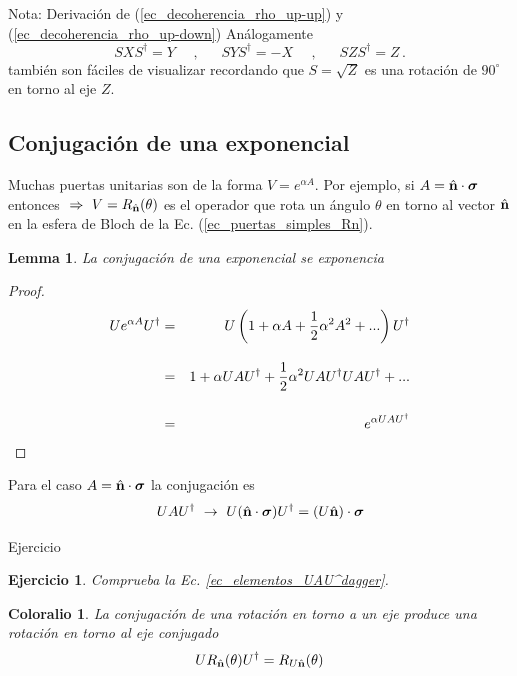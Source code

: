 \documentclass[a4paper,11pt]{book} %
\newtheorem{lemma_contador}{Lemma}
\newcommand{\Lemma}[1]{
		\begin{mybox_gray2}{}
			\begin{lemma_contador}
				 #1 
			\end{lemma_contador} 
		\end{mybox_gray2}
	}
\newtheorem{corolario_contador}{Coloralio}
\newcommand{\Corolario}[1]{
		\begin{mybox_gray2}{}
			\begin{corolario_contador}
				 #1 
			\end{corolario_contador} 
		\end{mybox_gray2}
	}
\newtheorem{ejercicio_contador}{Ejercicio}
\newcommand{\Ejercicio}[1]{
		\begin{mybox_gray}{Ejercicio} 
			\begin{ejercicio_contador}
				 #1 
			\end{ejercicio_contador} 
		\end{mybox_gray}
	}
\numberwithin{equation}{chapter}
\begin{document}
\begin{mybox_blue}{Nota: Derivación de (\ref{ec_decoherencia_rho_up-up}) y  (\ref{ec_decoherencia_rho_up-down})}
Análogamente
	\begin{equation*}
	S X S^\dagger  = Y ~~~~~~, ~~~~~~~ 
	S Y S^\dagger = -X ~~~~~~, ~~~~~~~ 
	S Z S^\dagger = Z \, .
	\end{equation*}
también  son fáciles de visualizar recordando que  $S=\sqrt{Z}$ es una rotación de $90^\circ$ en torno al eje $Z$.


        \subsection{Conjugación de una exponencial}

Muchas puertas unitarias son de la forma $V = e^{\alpha A}$. Por ejemplo, si  $A = \hat{\bf n}\cdot \boldsymbol{\sigma} $ entonces $  ~\Rightarrow ~V= R_{\hat{\bf n}}(\theta)$ es el operador que rota un ángulo $\theta$ en torno al vector $\hat{\bf n}$ en la esfera de Bloch de la Ec. (\ref{ec_puertas_simples_Rn}).

	\Lemma{
	La conjugación de una exponencial se exponencia
	}
	
	\begin{proof}
	\begin{eqnarray}
	U e^{\alpha A} U^\dagger &=&  U \left(1 + \alpha A  + \frac{1}{2} \alpha^2 A^2 + ... \right) U^\dagger \\ \rule{0mm}{8mm}
	&=& 1 + \alpha UAU^\dagger + \frac{1}{2}\alpha^2 UAU^\dagger U AU^\dagger + ... \\ \rule{0mm}{8mm}
	&=& e^{ \alpha UAU^\dagger} 
	\end{eqnarray}
	\end{proof}

Para el caso $A = \hat{\bf n}\cdot \boldsymbol{\sigma} $  la conjugación es
	\begin{equation} \label{ec_elementos_UAU^dagger}
	U A U^\dagger ~\to ~U (\hat{\bf n}\cdot \boldsymbol{\sigma} ) U^\dagger = (U\hat{\bf n})\cdot  \boldsymbol{\sigma}
	\end{equation}

	\Ejercicio{Comprueba la Ec. \ref{ec_elementos_UAU^dagger}.}

	\Corolario{La conjugación de una rotación en torno a un eje produce una rotación en torno al eje conjugado
	\begin{equation}
	U R_{\hat{\bf n}}(\theta) U^\dagger = R_{U\hat{\bf n}}(\theta)
	\end{equation}
	}
	

\end{mybox_blue}
\end{document}
